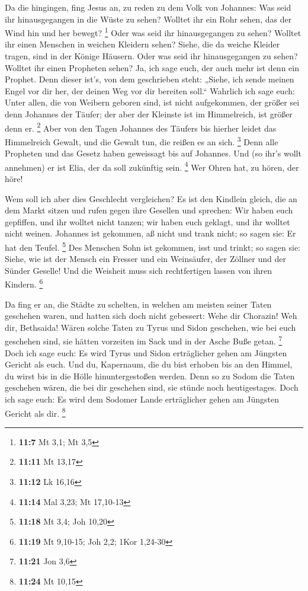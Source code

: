  Da die hingingen, fing Jesus an, zu reden zu dem Volk von
Johannes: Was seid ihr hinausgegangen in die Wüste zu sehen? Wolltet ihr
ein Rohr sehen, das der Wind hin und her bewegt? \footnote{\textbf{11:7}
  Mt 3,1; Mt 3,5}  Oder was seid ihr hinausgegangen zu
sehen? Wolltet ihr einen Menschen in weichen Kleidern sehen? Siehe, die
da weiche Kleider tragen, sind in der Könige Häusern.  Oder
was seid ihr hinausgegangen zu sehen? Wolltet ihr einen Propheten sehen?
Ja, ich sage euch, der auch mehr ist denn ein Prophet. 
Denn dieser ist's, von dem geschrieben steht: „Siehe, ich sende meinen
Engel vor dir her, der deinen Weg vor dir bereiten soll.`` 
Wahrlich ich sage euch: Unter allen, die von Weibern geboren sind, ist
nicht aufgekommen, der größer sei denn Johannes der Täufer; der aber der
Kleinste ist im Himmelreich, ist größer denn er. \footnote{\textbf{11:11}
  Mt 13,17}  Aber von den Tagen Johannes des Täufers bis
hierher leidet das Himmelreich Gewalt, und die Gewalt tun, die reißen es
an sich. \footnote{\textbf{11:12} Lk 16,16}  Denn alle
Propheten und das Gesetz haben geweissagt bis auf Johannes.
 Und (so ihr's wollt annehmen) er ist Elia, der da soll
zukünftig sein. \footnote{\textbf{11:14} Mal 3,23; Mt 17,10-13}
 Wer Ohren hat, zu hören, der höre!

 Wem soll ich aber dies Geschlecht vergleichen? Es ist den
Kindlein gleich, die an dem Markt sitzen und rufen gegen ihre Gesellen
 und sprechen: Wir haben euch gepfiffen, und ihr wolltet
nicht tanzen; wir haben euch geklagt, und ihr wolltet nicht weinen.
 Johannes ist gekommen, aß nicht und trank nicht; so sagen
sie: Er hat den Teufel. \footnote{\textbf{11:18} Mt 3,4; Joh 10,20}
 Des Menschen Sohn ist gekommen, isst und trinkt; so sagen
sie: Siehe, wie ist der Mensch ein Fresser und ein Weinsäufer, der
Zöllner und der Sünder Geselle! Und die Weisheit muss sich rechtfertigen
lassen von ihren Kindern. \footnote{\textbf{11:19} Mt 9,10-15; Joh 2,2;
  1Kor 1,24-30}

 Da fing er an, die Städte zu schelten, in welchen am
meisten seiner Taten geschehen waren, und hatten sich doch nicht
gebessert:  Wehe dir Chorazin! Weh dir, Bethsaida! Wären
solche Taten zu Tyrus und Sidon geschehen, wie bei euch geschehen sind,
sie hätten vorzeiten im Sack und in der Asche Buße getan. \footnote{\textbf{11:21}
  Jon 3,6}  Doch ich sage euch: Es wird Tyrus und Sidon
erträglicher gehen am Jüngsten Gericht als euch.  Und du,
Kapernaum, die du bist erhoben bis an den Himmel, du wirst bis in die
Hölle hinuntergestoßen werden. Denn so zu Sodom die Taten geschehen
wären, die bei dir geschehen sind, sie stünde noch heutigestages.
 Doch ich sage euch: Es wird dem Sodomer Lande erträglicher
gehen am Jüngsten Gericht als dir. \footnote{\textbf{11:24} Mt 10,15}

